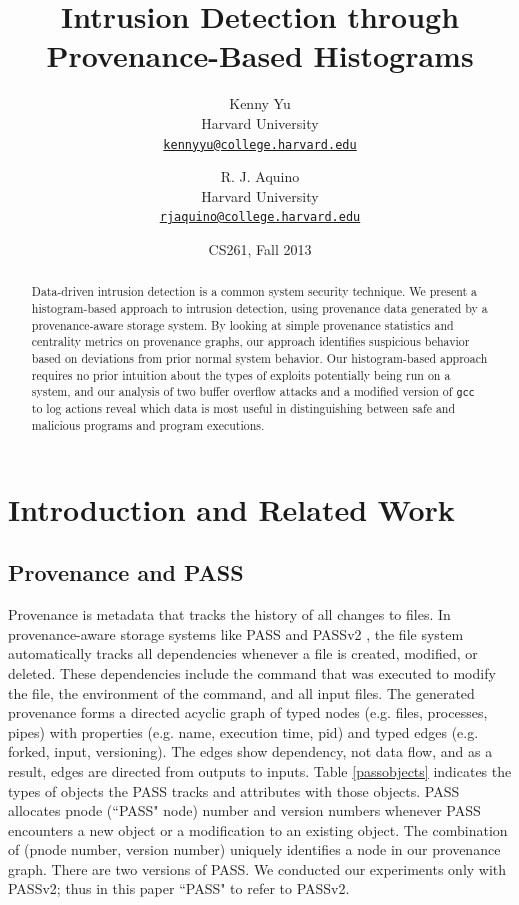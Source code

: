 \documentclass[10pt,twocolumn]{article}
\title{{\bf Intrusion Detection through Provenance-Based Histograms}}
\author{
    Kenny Yu\\
    Harvard University\\
    \href{mailto:kennyyu@college.harvard.edu}{\texttt{kennyyu@college.harvard.edu}}
  \and
    R. J. Aquino\\
    Harvard University\\
    \href{mailto:rjaquino@college.harvard.edu}{\texttt{rjaquino@college.harvard.edu}}
}
\date{CS261, Fall 2013}
\begin{document}
\maketitle

%

\begin{abstract}
Data-driven intrusion detection is a common system security technique. We present a histogram-based approach to intrusion detection, using provenance data generated by a provenance-aware storage system. By looking at simple provenance statistics and centrality metrics on provenance graphs, our approach identifies suspicious behavior based on deviations from prior normal system behavior. Our histogram-based approach requires no prior intuition about the types of exploits potentially being run on a system, and our analysis of two buffer overflow attacks and a modified version of \texttt{gcc} to log actions reveal which data is most useful in distinguishing between safe and malicious programs and program executions.
\end{abstract}

%

\section{Introduction and Related Work}

\subsection{Provenance and PASS}

Provenance is metadata that tracks the history of all changes to files. In provenance-aware storage systems like PASS \cite{pass} and PASSv2 \cite{passv2}, the file system automatically tracks all dependencies whenever a file is created, modified, or deleted. These dependencies include the command that was executed to modify the file, the environment of the command, and all input files. The generated provenance forms a directed acyclic graph of typed nodes (e.g. files, processes, pipes) with properties (e.g. name, execution time, pid) and typed edges (e.g. forked, input, versioning). The edges show dependency, not data flow, and as a result, edges are directed from outputs to inputs. Table \ref{passobjects} indicates the types of objects the PASS tracks and attributes with those objects. PASS allocates pnode (``PASS" node) number and version numbers whenever PASS encounters a new object or a modification to an existing object. The combination of (pnode number, version number) uniquely identifies a node in our provenance graph. There are two versions of PASS. We conducted our experiments only with PASSv2; thus in this paper ``PASS" to refer to PASSv2.
\end{document}
